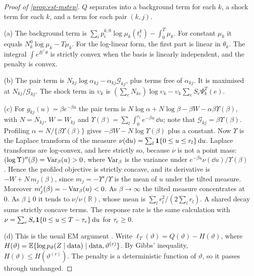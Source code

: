 \begin{proof}[Proof of \cref{prop:est-mstep}]
$Q$ separates into a background term for each $k$, a shock term for each $k$, and a term
for each pair $(k,j)$.

(a) The background term is $\sum_ip^{k,0}_i\log\mu_k(t^k_i)-\int_0^T\mu_k$. For constant
$\mu_k$ it equals $N^0_k\log\mu_k-T\mu_k$. For the log-linear form, the first part is linear
in $\theta_k$. The integral $\int e^{B^{\top}\theta}$ is strictly convex when the basis is
linearly independent, and the penalty is convex.

(b) The pair term is $N_{kj}\log\alpha_{kj}-\alpha_{kj}\mathcal G_{kj}$, plus terms free of
$\alpha_{kj}$. It is maximised at $N_{kj}/\mathcal G_{kj}$. The shock term in $\upsilon_k$ is
$(\sum_eN_{ke})\log\upsilon_k-\upsilon_k\sum_eS_e\Psi^T_k(e)$.

(c) For $g_{kj}(u)=\beta e^{-\beta u}$ the pair term is
$N\log\alpha+N\log\beta-\beta W-\alpha\beta\Upsilon(\beta)$, with $N=N_{kj}$, $W=W_{kj}$ and
$\Upsilon(\beta)=\sum_l\int_0^{r_l}e^{-\beta u}\,\dd u$; note that $\mathcal G_{kj}=\beta\Upsilon(\beta)$.
Profiling $\alpha=N/\{\beta\Upsilon(\beta)\}$ gives $-\beta W-N\log\Upsilon(\beta)$ plus a constant.
Now $\Upsilon$ is the Laplace transform of the measure $\nu(\mathrm{d} u)=\sum_l\mathbf{1}\!\left\{0\le u\le r_l\right\}\mathrm{d} u$.
Laplace transforms are log-convex, and here strictly so, because $\nu$ is not a point mass:
$(\log\Upsilon)''(\beta)=\operatorname{Var}_\beta(u)>0$, where $\operatorname{Var}_\beta$ is the variance under
$e^{-\beta u}\nu(\dd u)/\Upsilon(\beta)$. Hence the profiled objective is strictly concave, and
its derivative is $-W+N\,m_j(\beta)$, since $m_j=-\Upsilon'/\Upsilon$ is the mean of $u$ under the tilted
measure. Moreover $m_j'(\beta)=-\operatorname{Var}_\beta(u)<0$. As $\beta\to\infty$ the tilted measure
concentrates at $0$. As $\beta\downarrow0$ it tends to $\nu/\nu(\mathbb R)$, whose mean is
$\sum_lr_l^2/(2\sum_lr_l)$. A shared decay sums strictly concave terms. The response rate
is the same calculation with $\nu=\sum_eS_e\mathbf{1}\!\left\{0\le u\le T-\tau_e\right\}\mathrm{d} u$ for
$\tau_e\ge0$.

(d) This is the usual EM argument \citep{dempster1977}. Write
$\ell_T(\vartheta)=Q(\vartheta)-H(\vartheta)$, where
$H(\vartheta)=\mathbb{E}\{\log p_\vartheta(Z\mid\text{data})\mid\text{data},\vartheta^{(r)}\}$. By
Gibbs' inequality, $H(\vartheta)\le H(\vartheta^{(r)})$. The penalty is a deterministic
function of $\vartheta$, so it passes through unchanged.
\end{proof}

